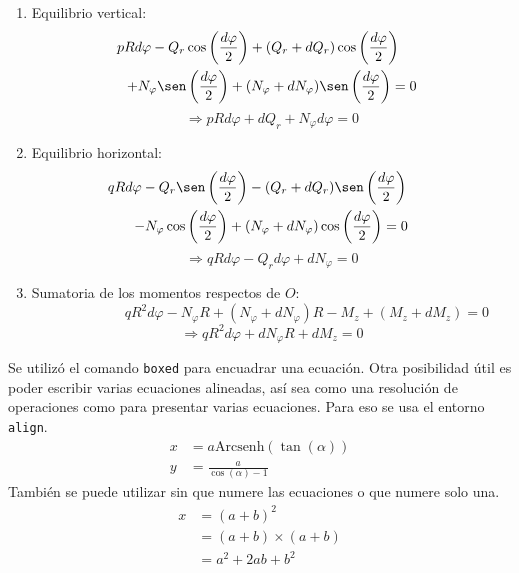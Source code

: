 \documentclass[a4paper,12pt]{article} %
\begin{document}
	\begin{enumerate}
	\item Equilibrio vertical:
	\begin{multline*}
	pRd\varphi-Q_r\cos\left(\frac{d\varphi}{2}\right)+(Q_r+dQ_r)\cos\left(\frac{d\varphi}{2}\right) \qquad\\
	+N_\varphi \sen\left(\frac{d\varphi}{2}\right)+(N_\varphi+dN_\varphi)\sen\left(\frac{d\varphi}{2}\right)=0
	\end{multline*}
	\begin{equation}\label{eq:mult1}
	\Rightarrow \boxed{pRd\varphi+dQ_r+N_\varphi d\varphi=0}
		\end{equation}
	\item Equilibrio horizontal:
	\begin{multline*}
	qRd\varphi-Q_r\sen\left(\frac{d\varphi}{2}\right)-(Q_r+dQ_r)\sen\left(\frac{d\varphi}{2}\right) \qquad \\
	-N_\varphi \cos\left(\frac{d\varphi}{2}\right)+(N_\varphi+dN_\varphi)\cos\left(\frac{d\varphi}{2}\right)=0
	\end{multline*}
	\begin{equation}\label{eq:mult2}
	\Rightarrow \boxed{qRd\varphi-Q_rd\varphi+dN_\varphi=0}
		\end{equation}
	\item Sumatoria de los momentos respectos de $O$:
	\begin{equation*}
	\qquad \qquad \quad qR^2d\varphi-N_\varphi R+(N_\varphi+dN_\varphi)R -M_z+(M_z+dM_z)=0
	\end{equation*}
	\begin{equation}\label{eq:mult3}
	\Rightarrow \boxed{qR^2d\varphi+dN_\varphi R + dM_z=0}
	\end{equation}
	\end{enumerate}
	Se utilizó el comando \verb|boxed| para encuadrar una ecuación. Otra posibilidad útil es poder escribir varias ecuaciones alineadas, así sea como una resolución de operaciones como para presentar varias ecuaciones. Para eso se usa el entorno \verb|align|.
	\begin{align}
	x&=a \text{Arcsenh}\left(\tan(\alpha) \right) \\
	y&=\frac{a}{\cos(\alpha)-1}
	\end{align}
	También se puede utilizar sin que numere las ecuaciones o que numere solo una.
	\begin{align}
	x & = (a+b)^2 \nonumber \\
	  & = (a+b)\times (a+b) \nonumber \\
	  & = a^2+2ab+b^2 
	\end{align}
	
\end{document}
